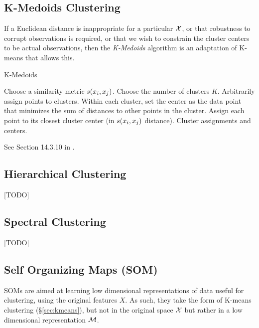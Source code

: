 \subsection{K-Medoids Clustering}
\label{sec:k_medoids}


If a Euclidean distance is inappropriate for a particular $\mathcal{X}$, or that robustness to corrupt observations is required, or that we wish to constrain the cluster centers to be actual observations, then the \emph{K-Medoids} algorithm is an adaptation of K-means that allows this.

\begin{algorithm}[H]
\caption{K-Medoids}
\begin{algorithmic}
\State Choose a similarity metric $s(x_i,x_j)$.
\State Choose the number of clusters $K$.
\State Arbitrarily assign points to clusters.
	\State Within each cluster, set the center as the data point that minimizes the sum of distances to other points in the cluster.
	\State Assign each point to its closest cluster center (in $s(x_i,x_j)$ distance).
\EndWhile
\State \Return Cluster assignments and centers.
\end{algorithmic}
\end{algorithm}


See Section 14.3.10 in \cite{hastie_elements_2003}.








\subsection{Hierarchical Clustering}
\label{sec:hierarchical}
[TODO]








\subsection{Spectral Clustering}
\label{sec:spectral_clustering}
[TODO]





\subsection{Self Organizing Maps (SOM)}
\label{sec:som}
SOMs are aimed at learning low dimensional representations of data useful for clustering, using the original features $X$.
As such, they take the form of K-means clustering (\S\ref{sec:kmeans}), but not in the original space $\mathcal{X}$ but rather in a low dimensional representation $\mathcal{M}$.


